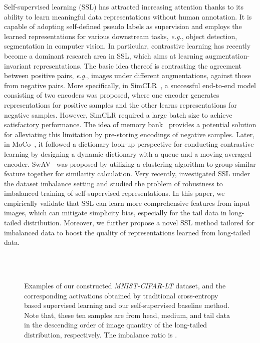 \documentclass[10pt,journal,compsoc]{IEEEtran}
\newcommand{\eg}{\emph{e.g.}}
\begin{document}
Self-supervised learning (SSL) has attracted increasing attention thanks to its ability to learn meaningful data representations without human annotation. It is capable of adopting self-defined pseudo labels as supervision and employs the learned representations for various downstream tasks, \eg, object detection, segmentation in computer vision. In particular, contrastive learning has recently become a dominant research area in SSL, which aims at learning augmentation-invariant representations. The basic idea thereof is contrasting the agreement between positive pairs, \eg, images under different augmentations, against those from negative pairs. More specifically, in SimCLR~\cite{chen2020simple}, a successful end-to-end model consisting of two encoders was proposed, where one encoder generates representations for positive samples and the other learns representations for negative samples. However, SimCLR required a large batch size to achieve satisfactory performance. The idea of memory bank~\cite{wu2018unsupervised} provides a potential solution for alleviating this limitation by pre-storing encodings of negative samples. Later, in MoCo~\cite{He_2020_CVPR}, it followed a dictionary look-up perspective for conducting contrastive learning by designing a dynamic dictionary with a queue and a moving-averaged encoder. SwAV~\cite{caron2020unsupervised} was proposed by utilizing a clustering algorithm to group similar feature together for similarity calculation. Very recently, \cite{tengyunipsworkshop} investigated SSL under the dataset imbalance setting and studied the problem of robustness to imbalanced training of self-supervised representations. In this paper, we empirically validate that SSL can learn more comprehensive features from input images, which can mitigate simplicity bias, especially for the tail data in long-tailed distribution. Moreover, we further propose a novel SSL method tailored for imbalanced data to boost the quality of representations learned from long-tailed data.

\begin{figure*}[t!]
	\centering
	\\
	\\
\caption{\small Examples of our constructed \emph{MNIST-CIFAR-LT} dataset, and the corresponding activations obtained by traditional cross-entropy based supervised learning and our self-supervised baseline method. Note that, these ten samples are from head, medium, and tail data in the descending order of image quantity of the long-tailed distribution, respectively. The imbalance ratio is .}
	\label{fig:pre_exp}
\end{figure*}
\end{document}
